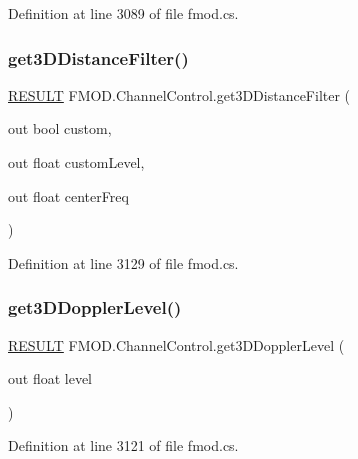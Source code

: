Definition at line 3089 of file fmod.\+cs.

\mbox{\label{class_f_m_o_d_1_1_channel_control_ae11ed7a17c50c27c431ba586a986d786}} 
\subsubsection{\texorpdfstring{get3\+D\+Distance\+Filter()}{get3DDistanceFilter()}}
{\footnotesize\ttfamily \hyperlink{namespace_f_m_o_d_a305d1176ef3f8c8815861a60407ac33d}{R\+E\+S\+U\+LT} F\+M\+O\+D.\+Channel\+Control.\+get3\+D\+Distance\+Filter (\begin{DoxyParamCaption}\item[{out bool}]{custom,  }\item[{out float}]{custom\+Level,  }\item[{out float}]{center\+Freq }\end{DoxyParamCaption})}



Definition at line 3129 of file fmod.\+cs.

\mbox{\label{class_f_m_o_d_1_1_channel_control_a3f7e173f285b5688f275f10ef0a14c47}} 
\subsubsection{\texorpdfstring{get3\+D\+Doppler\+Level()}{get3DDopplerLevel()}}
{\footnotesize\ttfamily \hyperlink{namespace_f_m_o_d_a305d1176ef3f8c8815861a60407ac33d}{R\+E\+S\+U\+LT} F\+M\+O\+D.\+Channel\+Control.\+get3\+D\+Doppler\+Level (\begin{DoxyParamCaption}\item[{out float}]{level }\end{DoxyParamCaption})}



Definition at line 3121 of file fmod.\+cs.

